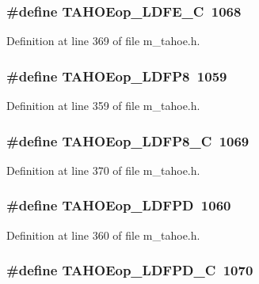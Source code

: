 \subsubsection{\setlength{\rightskip}{0pt plus 5cm}\#define TAHOEop\_\-LDFE\_\-C~1068}\label{m__tahoe_8h_cff631eba50ed65d96bf91d185a914f9}




Definition at line 369 of file m\_\-tahoe.h.
\subsubsection{\setlength{\rightskip}{0pt plus 5cm}\#define TAHOEop\_\-LDFP8~1059}\label{m__tahoe_8h_f7e2569c915dbfaceb20232faacc11b8}




Definition at line 359 of file m\_\-tahoe.h.
\subsubsection{\setlength{\rightskip}{0pt plus 5cm}\#define TAHOEop\_\-LDFP8\_\-C~1069}\label{m__tahoe_8h_05b775d70c00b9468cfdc901e41ca32b}




Definition at line 370 of file m\_\-tahoe.h.
\subsubsection{\setlength{\rightskip}{0pt plus 5cm}\#define TAHOEop\_\-LDFPD~1060}\label{m__tahoe_8h_759a5ec237f839171613bab2d1085118}




Definition at line 360 of file m\_\-tahoe.h.
\subsubsection{\setlength{\rightskip}{0pt plus 5cm}\#define TAHOEop\_\-LDFPD\_\-C~1070}\label{m__tahoe_8h_64d975fec6929de18086648bfda078ff}




